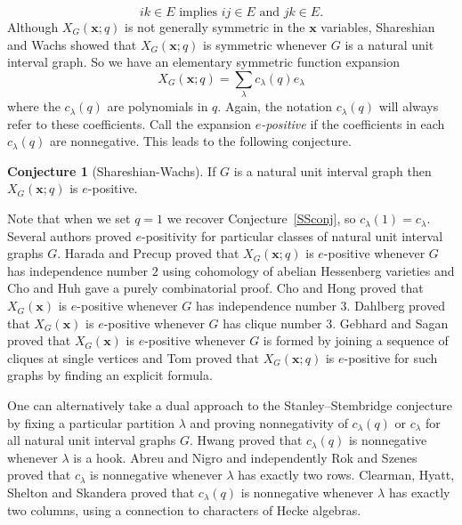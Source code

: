 \documentclass[12pt]{amsart}  %
\theoremstyle{definition}
\newtheorem{conjecture}[theorem]{Conjecture}
\theoremstyle{remark}
\numberwithin{equation}{section}
\newcommand{\la}{\lambda}
\begin{document}
\begin{equation}\label{eq:uicondition}
ik\in E \text{ implies } ij\in E \text{ and } jk\in E.
\end{equation}
Although $X_G(\bm x;q)$ is not generally symmetric in the $\bm x$ variables, Shareshian and Wachs \cite[Theorem 4.5]{chromposquasi} showed that $X_G(\bm x;q)$ is symmetric whenever $G$ is a natural unit interval graph. 
So we have an elementary symmetric function expansion
\begin{equation}
\label{c_la(q)}
X_G(\bm x;q)=\sum_\lambda c_\lambda(q)e_\lambda
\end{equation}
where the $c_\la(q)$ are polynomials in $q$.  
Again, the notation $c_\la(q)$ will always refer to these coefficients.
Call the expansion {\em $e$-positive} if the coefficients in each $c_\la(q)$ are nonnegative.
This leads to the following conjecture.
\begin{conjecture}[Shareshian-Wachs]
\label{SWconj}
 If $G$ is a natural unit interval graph
 then $X_G(\bm x;q)$ is $e$-positive.
\end{conjecture}
Note that when we set $q=1$ we recover Conjecture~\ref{SSconj}, so $c_\lambda(1)=c_\lambda$.
Several authors proved $e$-positivity for particular classes of natural unit interval graphs $G$. Harada and Precup \cite[Theorem 6.1]{stanstemhess} proved that $X_G(\bm x;q)$ is $e$-positive whenever $G$ has independence number $2$ using cohomology of abelian Hessenberg varieties and Cho and Huh \cite[Theorem 3.3]{chromstoe} gave a purely combinatorial proof. Cho and Hong \cite[Theorem 1.8]{chrombounce3} proved that $X_G(\bm x)$ is $e$-positive whenever $G$ has independence number $3$. Dahlberg \cite[Corollary 5.4]{trilad} proved that $X_G(\bm x)$ is $e$-positive whenever $G$ has clique number $3$. Gebhard and Sagan \cite[Corollary 7.7]{chromnsym} proved that $X_G(\bm x)$ is $e$-positive whenever $G$ is formed by joining a sequence of cliques at single vertices and Tom \cite[Corollary 4.20]{qforesttriples} proved that $X_G(\bm x;q)$ is $e$-positive for such graphs by finding an explicit formula. 

One can alternatively take a dual approach to the Stanley--Stembridge conjecture by fixing a particular partition $\lambda$ and proving nonnegativity of $c_\lambda(q)$ or $c_\lambda$ for all natural unit interval graphs $G$. Hwang \cite[Theorem 5.13]{chromtwoparthook} proved that $c_\lambda(q)$ is nonnegative whenever $\lambda$ is a hook. Abreu and Nigro \cite[Corollary 1.10]{chromhesssplitting} and independently Rok and Szenes \cite[Theorem 4.1]{chromeschers} proved that $c_\lambda$ is nonnegative whenever $\lambda$ has exactly two rows. Clearman, Hyatt, Shelton and Skandera \cite[Theorem 10.3]{chromhecke} proved that $c_\lambda(q)$ is nonnegative whenever $\lambda$ has exactly two columns, using a connection to characters of Hecke algebras. 
\end{document}
